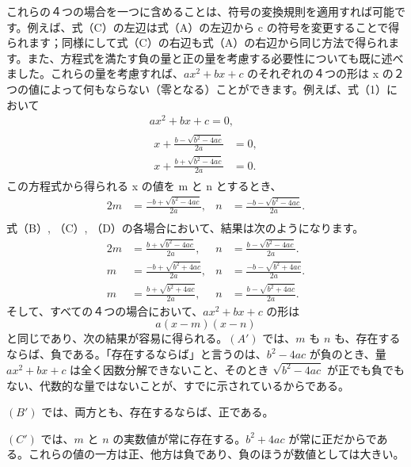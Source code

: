 \documentclass[a4paper,11pt,openany]{ltjsbook}
\newcommand{\Eq}[1]{\ensuremath{#1}}
\begin{document}
これらの４つの場合を一つに含めることは、符号の変換規則を適用すれば可能です。例えば、式（C）の左辺は式（A）の左辺から c の符号を変更することで得られます；同様にして式（C）の右辺も式（A）の右辺から同じ方法で得られます。また、方程式を満たす負の量と正の量を考慮する必要性についても既に述べました。これらの量を考慮すれば、$ax^{2} + bx + c$ のそれぞれの４つの形は x の２つの値によって何もならない（零となる）ことができます。例えば、式（1）において
\begin{gather*}
ax^{2} + bx + c = 0, \\
\begin{aligned}
x + \frac{b - \sqrt{b^{2} - 4ac}}{2a} &= 0, \\
x + \frac{b + \sqrt{b^{2} - 4ac}}{2a} &= 0.
\end{aligned}
\end{gather*}
この方程式から得られる x の値を m と n とするとき、
\begin{alignat*}{2}
m &= \frac{-b + \sqrt{b^{2} - 4ac}}{2a}, & n &= \frac{-b - \sqrt{b^{2} - 4ac}}{2a}. \tag{(A')}\\
\end{alignat*}
式（B）, （C）, （D）の各場合において、結果は次のようになります。
\begin{alignat*}{2}
m &= \frac{b + \sqrt{b^{2} - 4ac}}{2a}, & n &= \frac{b - \sqrt{b^{2} - 4ac}}{2a}. \tag{(B')}\\
m &= \frac{-b + \sqrt{b^{2} + 4ac}}{2a}, & n &= \frac{-b - \sqrt{b^{2} + 4ac}}{2a}. \tag{(C')}\\
m &= \frac{b + \sqrt{b^{2} + 4ac}}{2a}, & n &= \frac{b - \sqrt{b^{2} + 4ac}}{2a}. \tag{(D')}
\end{alignat*}
そして、すべての４つの場合において、$ax^{2} + bx + c$ の形は
\[
a(x - m)(x - n)
\]
と同じであり、次の結果が容易に得られる。\Eq{(A')} では、$m$ も $n$ も、存在するならば、負である。「存在するならば」と言うのは、$b^{2} - 4ac$ が負のとき、量 $ax^{2} + bx + c$ は全く因数分解できないこと、そのとき $\sqrt{b^{2} - 4ac}$ が正でも負でもない、代数的な量ではないことが、すでに示されているからである。

\Eq{(B')} では、両方とも、存在するならば、正である。

\Eq{(C')} では、$m$ と $n$ の実数値が常に存在する。$b^{2} + 4ac$ が常に正だからである。これらの値の一方は正、他方は負であり、負のほうが数値としては大きい。
\end{document}
